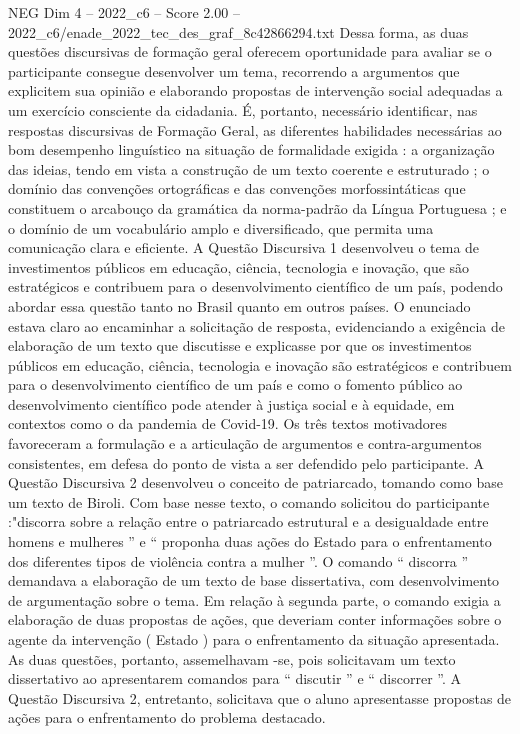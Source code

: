\begin{textsample}{NEG Dim 4 – 2022\_c6 – Score 2.00 – 2022\_c6/enade\_2022\_tec\_des\_graf\_8c42866294.txt}
Dessa forma, as duas questões discursivas de formação geral oferecem oportunidade para avaliar se o participante consegue desenvolver um tema, recorrendo a argumentos que explicitem sua opinião e elaborando propostas de intervenção social adequadas a um exercício consciente da cidadania.
É, portanto, necessário identificar, nas respostas discursivas de Formação Geral, as diferentes habilidades necessárias ao bom desempenho linguístico na situação de formalidade exigida : a organização das ideias, tendo em vista a construção de um texto coerente e estruturado ; o domínio das convenções ortográficas e das convenções morfossintáticas que constituem o arcabouço da gramática da norma-padrão da Língua Portuguesa ; e o domínio de um vocabulário amplo e diversificado, que permita uma comunicação clara e eficiente.
A Questão Discursiva 1 desenvolveu o tema de investimentos públicos em educação, ciência, tecnologia e inovação, que são estratégicos e contribuem para o desenvolvimento científico de um país, podendo abordar essa questão tanto no Brasil quanto em outros países.
O enunciado estava claro ao encaminhar a solicitação de resposta, evidenciando a exigência de elaboração de um texto que discutisse e explicasse por que os investimentos públicos em educação, ciência, tecnologia e inovação são estratégicos e contribuem para o desenvolvimento científico de um país e como o fomento público ao desenvolvimento científico pode atender à justiça social e à equidade, em contextos como o da pandemia de Covid-19.
Os três textos motivadores favoreceram a formulação e a articulação de argumentos e contra-argumentos consistentes, em defesa do ponto de vista a ser defendido pelo participante.
A Questão Discursiva 2 desenvolveu o conceito de patriarcado, tomando como base um texto de Biroli.
Com base nesse texto, o comando solicitou do participante :"discorra sobre a relação entre o patriarcado estrutural e a desigualdade entre homens e mulheres ” e “ proponha duas ações do Estado para o enfrentamento dos diferentes tipos de violência contra a mulher ”.
O comando “ discorra ” demandava a elaboração de um texto de base dissertativa, com desenvolvimento de argumentação sobre o tema.
Em relação à segunda parte, o comando exigia a elaboração de duas propostas de ações, que deveriam conter informações sobre o agente da intervenção ( Estado ) para o enfrentamento da situação apresentada.
As duas questões, portanto, assemelhavam -se, pois solicitavam um texto dissertativo ao apresentarem comandos para “ discutir ” e “ discorrer ”.
A Questão Discursiva 2, entretanto, solicitava que o aluno apresentasse propostas de ações para o enfrentamento do problema destacado.

\end{textsample}
